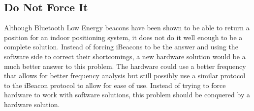 \subsection{Do Not Force It}
Although Bluetooth Low Energy beacons have been shown to be able to return a position for an indoor positioning system, it does not do it well enough
to be a complete solution. Instead of forcing iBeacons to be the answer and using the software side to correct their shortcomings, a new hardware solution
would be a much better answer to this problem. The hardware could use a better frequency that allows for better frequency analysis but still possibly use
a similar protocol to the iBeacon protocol to allow for ease of use. Instead of trying to force hardware to work with software solutions, this problem should be conquered
by a hardware solution.
